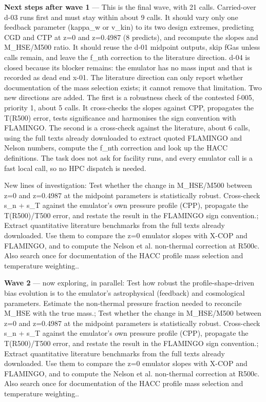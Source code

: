 \documentclass[11pt,a4paper]{article}
\begin{document}
\textbf{Next steps after wave 1} --- This is the final wave, with 21 calls. Carried-over d-03 runs first and must stay within about 9 calls. It should vary only one feedback parameter (kappa\_w or v\_kin) to its two design extremes, predicting CGD and CTP at z=0 and z=0.4987 (8 predicts), and recompute the slopes and M\_HSE/M500 ratio. It should reuse the d-01 midpoint outputs, skip fGas unless calls remain, and leave the f\_nth correction to the literature direction. d-04 is closed because its blocker remains: the emulator has no mass input and that is recorded as dead end x-01. The literature direction can only report whether documentation of the mass selection exists; it cannot remove that limitation. Two new directions are added. The first is a robustness check of the contested f-005, priority 1, about 5 calls. It cross-checks the slopes against CPP, propagates the T(R500) error, tests significance and harmonises the sign convention with FLAMINGO. The second is a cross-check against the literature, about 6 calls, using the full texts already downloaded to extract quoted FLAMINGO and Nelson numbers, compute the f\_nth correction and look up the HACC definitions. The task does not ask for facility runs, and every emulator call is a fast local call, so no HPC dispatch is needed.

New lines of investigation: Test whether the change in M\_HSE/M500 between z=0 and z=0.4987 at the midpoint parameters is statistically robust. Cross-check s\_n + s\_T against the emulator's own pressure profile (CPP), propagate the T(R500)/T500 error, and restate the result in the FLAMINGO sign convention.; Extract quantitative literature benchmarks from the full texts already downloaded. Use them to compare the z=0 emulator slopes with X-COP and FLAMINGO, and to compute the Nelson et al. non-thermal correction at R500c. Also search once for documentation of the HACC profile mass selection and temperature weighting..

\textbf{Wave 2} --- now exploring, in parallel: Test how robust the profile-shape-driven bias evolution is to the emulator's astrophysical (feedback) and cosmological parameters. Estimate the non-thermal pressure fraction needed to reconcile M\_HSE with the true mass.; Test whether the change in M\_HSE/M500 between z=0 and z=0.4987 at the midpoint parameters is statistically robust. Cross-check s\_n + s\_T against the emulator's own pressure profile (CPP), propagate the T(R500)/T500 error, and restate the result in the FLAMINGO sign convention.; Extract quantitative literature benchmarks from the full texts already downloaded. Use them to compare the z=0 emulator slopes with X-COP and FLAMINGO, and to compute the Nelson et al. non-thermal correction at R500c. Also search once for documentation of the HACC profile mass selection and temperature weighting..
\end{document}
